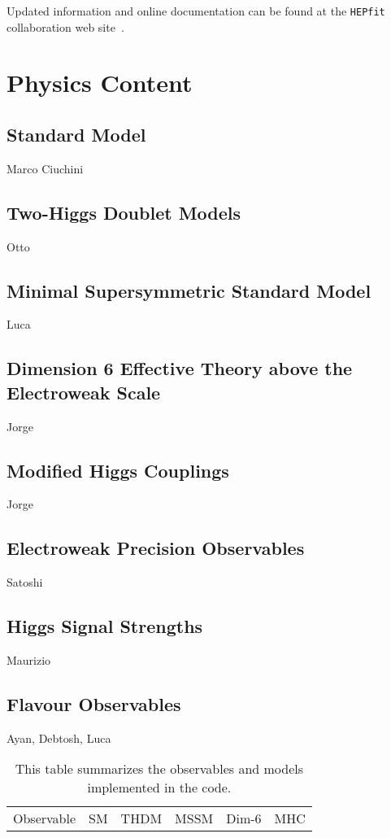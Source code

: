\documentclass[aps,superscriptaddress,nofootinbib,floatfix,notitlepage]{revtex4-1}
\newcommand{\HEPfit}{\texttt{HEPfit}\xspace}
\begin{document}
Updated information and online documentation can be found at the
\HEPfit collaboration web site~\cite{website}.

\section{Physics Content}
\label{sec:Physics}

\subsection{Standard Model}
\label{sec:SM}
Marco Ciuchini
\subsection{Two-Higgs Doublet Models}
\label{sec:THDM}
Otto
\subsection{Minimal Supersymmetric Standard Model}
\label{sec:MSSM}
Luca
\subsection{Dimension 6 Effective Theory above the Electroweak Scale }
\label{sec:Dim6}
Jorge
\subsection{Modified Higgs Couplings}
\label{sec:Higgs}
Jorge
\subsection{Electroweak Precision Observables}
\label{sec:EWPO}
Satoshi
\subsection{Higgs Signal Strengths}
\label{sec:HSS}
Maurizio
\subsection{Flavour Observables}
\label{sec:Flavour}
Ayan, Debtosh, Luca
\begin{table}
  \centering
  \begin{tabular}{lccccc}
    Observable & SM & THDM & MSSM & Dim-6 & MHC \\
  \end{tabular}
  \caption{This table summarizes the observables and models
    implemented in the code.}
  \label{tab:summary}
\end{table}
\end{document}
